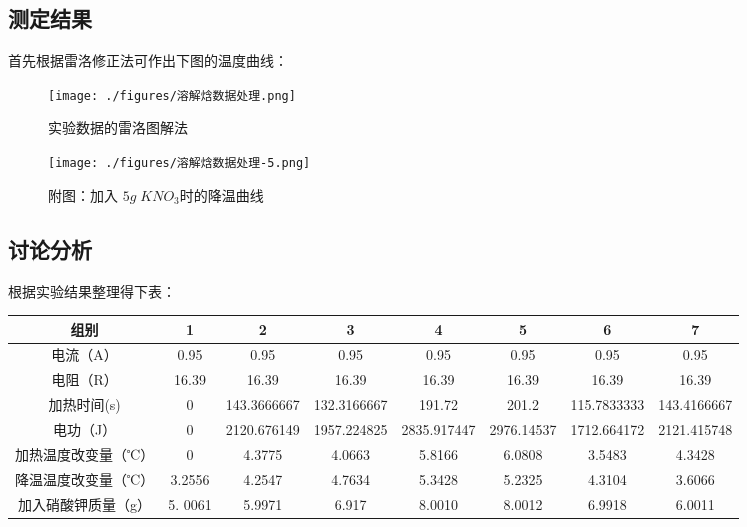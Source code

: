 \documentclass[4pt,a4papper]{article}
\begin{document}
\subsection{测定结果}
首先根据雷洛修正法可作出下图的温度曲线：

    \begin{figure}[htbp]
        \centering
        \texttt{[image: ./figures/溶解焓数据处理.png]}
        \caption{实验数据的雷洛图解法} \label{fig:1}
    \end{figure}
    \begin{figure}[htbp]
        \centering
        \texttt{[image: ./figures/溶解焓数据处理-5.png]}
        \caption{附图：加入 $5g\; KNO_3$时的降温曲线} \label{fig:1}
    \end{figure}


\subsection{讨论分析}
根据实验结果整理得下表：
\begin{table}[htbp]
\begin{tabular}{|c|c|c|c|c|c|c|c|}
\hline
组别         & 1       & 2           & 3           & 4           & 5          & 6           & 7           \\ \hline
电流（A）      & 0.95    & 0.95        & 0.95        & 0.95        & 0.95       & 0.95        & 0.95        \\ \hline
电阻（R）      & 16.39   & 16.39       & 16.39       & 16.39       & 16.39      & 16.39       & 16.39       \\ \hline
加热时间(s)    & 0       & 143.3666667 & 132.3166667 & 191.72      & 201.2      & 115.7833333 & 143.4166667 \\ \hline
电功（J）      & 0       & 2120.676149 & 1957.224825 & 2835.917447 & 2976.14537 & 1712.664172 & 2121.415748 \\ \hline
加热温度改变量（℃） & 0       & 4.3775      & 4.0663      & 5.8166      & 6.0808     & 3.5483      & 4.3428      \\ \hline
降温温度改变量（℃） & 3.2556  & 4.2547      & 4.7634      & 5.3428      & 5.2325     & 4.3104      & 3.6066      \\ \hline
加入硝酸钾质量（g） & 5. 0061 & 5.9971      & 6.917       & 8.0010      & 8.0012     & 6.9918      & 6.0011      \\ \hline
\end{tabular}
\end{table}
\end{document}
